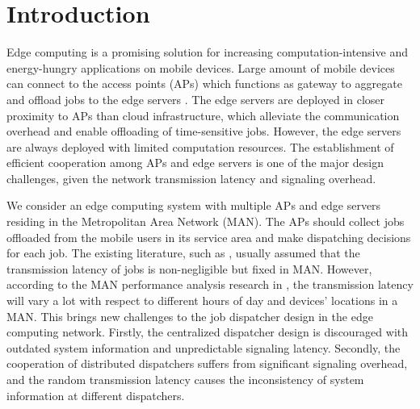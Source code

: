 
\section{Introduction}
Edge computing is a promising solution for increasing computation-intensive and energy-hungry applications on mobile devices.
Large amount of mobile devices can connect to the access points (APs) which functions as gateway to aggregate and offload jobs to the edge servers \cite{MEC-SURVEY}.
The edge servers are deployed in closer proximity to APs than cloud infrastructure, which alleviate the communication overhead and enable offloading of time-sensitive jobs.
However, the edge servers are always deployed with limited computation resources.
The establishment of efficient cooperation among APs and edge servers is one of the major design challenges, given the network transmission latency and signaling overhead.

We consider an edge computing system with multiple APs and edge servers residing in the Metropolitan Area Network (MAN).
The APs should collect jobs offloaded from the mobile users in its service area and make dispatching decisions for each job.
The existing literature, such as \cite{tan-online,MOBIHOC19-ZhouZ,IOTJ18-FanQ,TOC19-LiuC,JSAC19-AlameddineHA}, usually assumed that the transmission latency of jobs is non-negligible but fixed in MAN.
However, according to the MAN performance analysis research in \cite{MAN-LATENCY}, the transmission latency will vary a lot with respect to different hours of day and devices' locations in a MAN.
This brings new challenges to the job dispatcher design in the edge computing network.
Firstly, the centralized dispatcher design is discouraged with outdated system information and unpredictable signaling latency.
Secondly, the cooperation of distributed dispatchers suffers from significant signaling overhead, and the random transmission latency causes the inconsistency of system information at different dispatchers.

